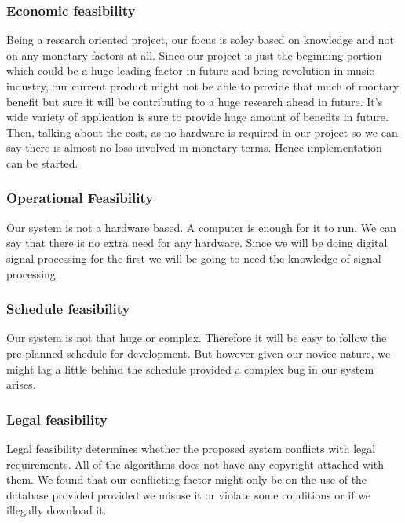 \newpage
\subsubsection{Economic feasibility}
Being a research oriented project, our focus is soley based on knowledge and not on any monetary factors at all.
Since our project is just the beginning portion which could be a huge leading factor in future and bring
revolution in music industry, our current product might not be able to provide that much of montary benefit but sure it will be contributing to a huge research ahead in future.
It's wide variety of application is sure to provide huge amount of benefits in future.
Then, talking about the cost, as no hardware is required in our project so we can say there is almost no loss involved in monetary terms. Hence implementation can be started.

\subsubsection{Operational Feasibility}
Our system is not a hardware based. A computer is enough for it to run. We can say that there is no extra need for any hardware. Since we will be doing digital signal processing for the first we will be going to need
the knowledge of signal processing.

\subsubsection{Schedule feasibility}
Our system is not that huge or complex. Therefore it will be easy to follow the pre-planned schedule for development. But however given our novice nature, we might lag a little behind the schedule provided a complex bug in our system arises.

\subsubsection{Legal feasibility}
Legal feasibility determines whether the proposed system conflicts with legal requirements.
All of the algorithms does not have any copyright attached with them. We found that our conflicting factor might only be on the use of the database provided provided we misuse it or violate some conditions or if 
we illegally download it.


